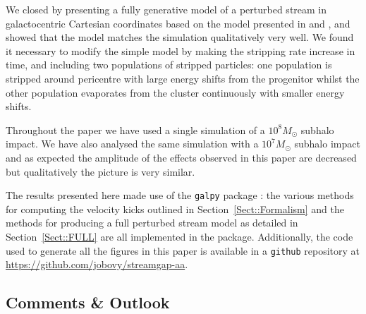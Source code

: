 \documentclass[useAMS,usenatbib,fleqn,a4paper]{mn2e}
\begin{document}
We closed by presenting a fully generative model of a perturbed stream in galactocentric Cartesian coordinates based on the model presented in \cite{Bovy2014} and \cite{Sanders2014}, and showed that the model matches the simulation qualitatively very well. We found it necessary to modify the simple model by making the stripping rate increase in time, and including two populations of stripped particles: one population is stripped around pericentre with large energy shifts from the progenitor whilst the other population evaporates from the cluster continuously with smaller energy shifts.

Throughout the paper we have used a single simulation of a $10^8M_\odot$ subhalo impact. We have also analysed the same simulation with a $10^7M_\odot$ subhalo impact and as expected the amplitude of the effects observed in this paper are decreased but qualitatively the picture is very similar.

The results presented here made use of the \texttt{galpy} package \citep{galpy}: the various methods for computing the velocity kicks outlined in Section~\ref{Sect::Formalism} and the methods for producing a full perturbed stream model as detailed in Section~\ref{Sect::FULL} are all implemented in the package. Additionally, the code used to generate all the figures in this paper is available in a \texttt{github} repository at \href{https://github.com/jobovy/streamgap-aa}{https://github.com/jobovy/streamgap-aa}.

\subsection{Comments \& Outlook}
\end{document}
